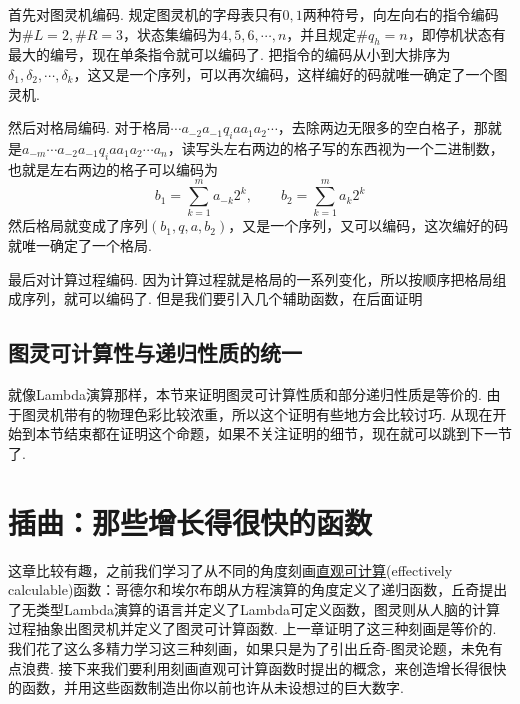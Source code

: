 \begin{note}
    首先对图灵机编码. 规定图灵机的字母表只有\(0,1\)两种符号，向左向右的指令编码为\(\#L=2,\#R=3\)，状态集编码为\(4,5,6,\cdots,n\)，并且规定\(\#q_h=n\)，即停机状态有最大的编号，现在单条指令就可以编码了. 把指令的编码从小到大排序为\(\delta_1,\delta_2, \cdots,\delta_k\)，这又是一个序列，可以再次编码，这样编好的码就唯一确定了一个图灵机.

    然后对格局编码. 对于格局\(\cdots a_{-2}a_{-1}q_iaa_1a_2\cdots\)，去除两边无限多的空白格子，那就是\(a_{-m} \cdots a_{-2}a_{-1}q_iaa_1a_2\cdots a_n\)，读写头左右两边的格子写的东西视为一个二进制数，也就是左右两边的格子可以编码为
    \[b_1 = \sum_{k=1}^ma_{-k}2^k, \qquad b_2 = \sum_{k=1}^ma_{k}2^k\]
    然后格局就变成了序列\((b_1,q,a,b_2)\)，又是一个序列，又可以编码，这次编好的码就唯一确定了一个格局.

    最后对计算过程编码. 因为计算过程就是格局的一系列变化，所以按顺序把格局组成序列，就可以编码了. 但是我们要引入几个辅助函数，在后面证明
\end{note}


\subsection{图灵可计算性与递归性质的统一}

就像Lambda演算那样，本节来证明图灵可计算性质和部分递归性质是等价的. 由于图灵机带有的物理色彩比较浓重，所以这个证明有些地方会比较讨巧. 从现在开始到本节结束都在证明这个命题，如果不关注证明的细节，现在就可以跳到下一节了.


\section{插曲：那些增长得很快的函数}

这章比较有趣，之前我们学习了从不同的角度刻画\underline{直观可计算}(effectively calculable)函数：哥德尔和埃尔布朗从方程演算的角度定义了递归函数，丘奇提出了无类型Lambda演算的语言并定义了Lambda可定义函数，图灵则从人脑的计算过程抽象出图灵机并定义了图灵可计算函数. 上一章证明了这三种刻画是等价的. 我们花了这么多精力学习这三种刻画，如果只是为了引出丘奇-图灵论题，未免有点浪费. 接下来我们要利用刻画直观可计算函数时提出的概念，来创造增长得很快的函数，并用这些函数制造出你以前也许从未设想过的巨大数字.

